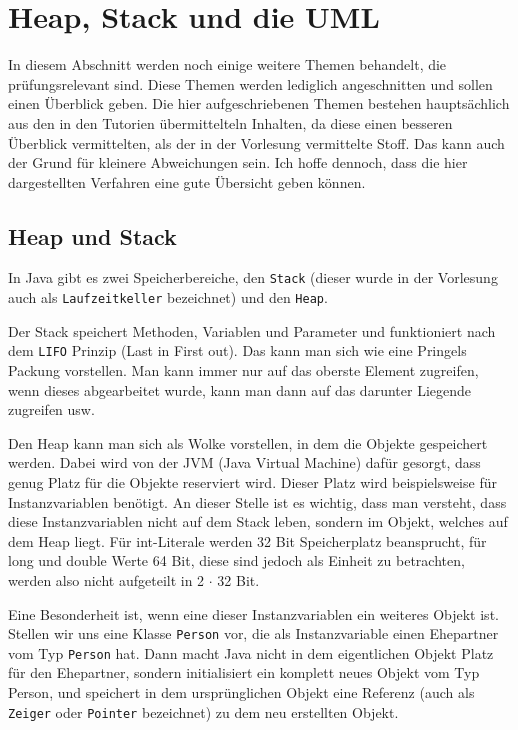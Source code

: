 \chapter{Heap, Stack und die UML}

\ifpdf
	\graphicspath{{Chapter3/Figs/UML/}{Chapter3/Figs/Raster/}{Chapter3/Figs/PDF/}{Chapter3/Figs/}}
\else
    \graphicspath{{Chapter3/Figs/UML/}{Chapter3/Figs/Vector/}{Chapter3/Figs/}}
\fi

In diesem Abschnitt werden noch einige weitere Themen behandelt, die prüfungsrelevant sind. Diese Themen werden lediglich angeschnitten und sollen einen Überblick geben. Die hier aufgeschriebenen Themen bestehen hauptsächlich aus den in den Tutorien übermittelteln Inhalten, da diese einen besseren Überblick vermittelten, als der in der Vorlesung vermittelte Stoff. Das kann auch der Grund für kleinere Abweichungen sein. Ich hoffe dennoch, dass die hier dargestellten Verfahren eine gute Übersicht geben können. 


\section{Heap und Stack}

In Java gibt es zwei Speicherbereiche, den \texttt{Stack} (dieser wurde in der Vorlesung auch als \texttt{Laufzeitkeller} bezeichnet) und den \texttt{Heap}. 

Der Stack speichert Methoden, Variablen und Parameter und funktioniert nach dem \texttt{LIFO} Prinzip (Last in First out). Das kann man sich wie eine Pringels Packung vorstellen. Man kann immer nur auf das oberste Element zugreifen, wenn dieses abgearbeitet wurde, kann man dann auf das darunter Liegende zugreifen usw.

Den Heap kann man sich als Wolke vorstellen, in dem die Objekte gespeichert werden. Dabei wird von der JVM (Java Virtual Machine) dafür gesorgt, dass genug Platz für die Objekte reserviert wird. Dieser Platz wird beispielsweise für Instanzvariablen benötigt. An dieser Stelle ist es wichtig, dass man versteht, dass diese Instanzvariablen nicht auf dem Stack leben, sondern im Objekt, welches auf dem Heap liegt. Für int-Literale werden 32 Bit Speicherplatz beansprucht, für long und double Werte 64 Bit, diese sind jedoch als Einheit zu betrachten, werden also nicht aufgeteilt in 2 $\cdot$ 32 Bit.

Eine Besonderheit ist, wenn eine dieser Instanzvariablen ein weiteres Objekt ist. Stellen wir uns eine Klasse \texttt{Person} vor, die als Instanzvariable einen Ehepartner vom Typ \texttt{Person} hat. Dann macht Java nicht in dem eigentlichen Objekt Platz für den Ehepartner, sondern initialisiert ein komplett neues Objekt vom Typ Person, und speichert in dem ursprünglichen Objekt eine Referenz (auch als \texttt{Zeiger} oder \texttt{Pointer} bezeichnet) zu dem neu erstellten Objekt.


